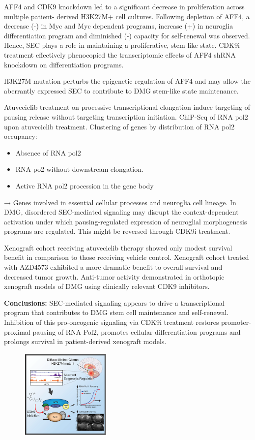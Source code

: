 AFF4 and CDK9 knockdown led to a significant
decrease in proliferation across multiple patient-
derived H3K27M+ cell cultures.
Following depletion of AFF4, a decrease (-) in Myc and Myc dependent programs, increase (+) in neuroglia differentiation program
and diminished (-) capacity for self-renewal was observed. Hence, SEC plays a role in maintaining a proliferative, stem-like state. CDK9i treatment effectively phenocopied the transcriptomic effects of AFF4 shRNA knockdown on differentiation programs.

H3K27M mutation perturbs the epigenetic regulation of AFF4 and may allow the aberrantly expressed SEC to contribute to DMG stem-like state maintenance.

Atuveciclib treatment on processive transcriptional
elongation induce targeting of pausing release
without targeting transcription initiation. ChiP-Seq of RNA pol2 upon atuveciclib treatment.
Clustering of genes by distribution of RNA pol2
occupancy:
\begin{itemize}
\tightlist
\item Absence of RNA pol2
\item RNA po2 without downstream elongation.
\item Active RNA pol2 procession in the gene body
\end{itemize}
→ Genes involved in essential cellular
processes and neuroglia cell lineage.
In DMG, disordered SEC-mediated signaling may disrupt the context-dependent activation under which
pausing-regulated expression of neuroglial morphogenesis programs are regulated. This might be
reversed through CDK9i treatment.

Xenograft cohort receiving atuveciclib therapy
showed only modest survival benefit in
comparison to those receiving vehicle control.
Xenograft cohort treated with AZD4573
exhibited a more dramatic benefit to overall
survival and decreased tumor growth.
Anti-tumor activity demonstrated in orthotopic xenograft models of DMG using clinically relevant CDK9 inhibitors.

\textbf{Conclusions:}
SEC-mediated signaling appears to drive a
transcriptional program that contributes to DMG stem
cell maintenance and self-renewal.
Inhibition of this pro-oncogenic signaling via CDK9i
treatment restores promoter-proximal pausing of RNA
Pol2, promotes cellular differentiation programs and
prolongs survival in patient-derived xenograft models.

\begin{figure}
\centering
\includegraphics[width=0.4\textwidth]{../_resources/Screen_Shot_2022-12-20_at_12-43-26.png}
\caption{}
\end{figure}

